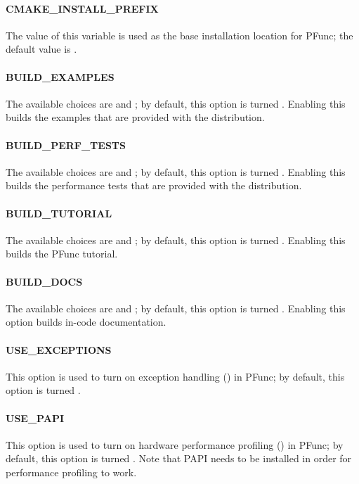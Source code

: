 \paragraph{CMAKE\_INSTALL\_PREFIX}
The value of this variable is used as the base installation location for PFunc;
the default value is .

\paragraph{BUILD\_EXAMPLES}
The available choices are  and ; by default, this 
option is turned . 
%
Enabling this builds the examples that are provided with the distribution.

\paragraph{BUILD\_PERF\_TESTS}
The available choices are  and ; by default, this 
option is turned .
%
Enabling this builds the performance tests that are provided with the
distribution.

\paragraph{BUILD\_TUTORIAL}
The available choices are  and ; by default, this 
option is turned .
%
Enabling this builds the PFunc tutorial.

\paragraph{BUILD\_DOCS}
The available choices are  and ; by default, this 
option is turned .
%
Enabling this option builds in-code documentation. 

\paragraph{USE\_EXCEPTIONS}
This option is used to turn on exception handling () in PFunc; by
default, this option is turned .

\paragraph{USE\_PAPI}
This option is used to turn on hardware performance profiling () in 
PFunc; by default, this option is turned .
%
Note that PAPI needs to be installed in order for performance profiling to 
work.


